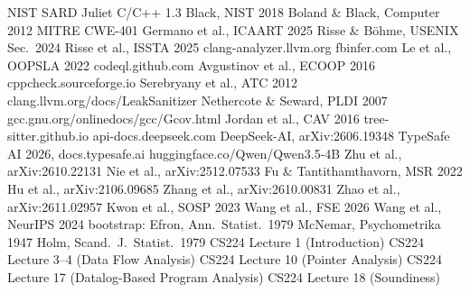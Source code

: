 \newcommand{\bib}[1]{\ifcsname bib-#1\endcsname\csname bib-#1\endcsname\else\textbf{??#1}\fi}
\newcommand{\defbib}[2]{\expandafter\def\csname bib-#1\endcsname{#2}}
\defbib{sardjuliet13}{NIST SARD Juliet C/C++ 1.3}
\defbib{black2018juliet13}{Black, NIST 2018}
\defbib{boland2012juliet}{Boland \& Black, Computer 2012}
\defbib{mitrecwe401}{MITRE CWE-401}
\defbib{germano2025biased}{Germano et al., ICAART 2025}
\defbib{risse2024limits}{Risse \& B\"ohme, USENIX Sec.\ 2024}
\defbib{risse2025topscore}{Risse et al., ISSTA 2025}
\defbib{clangsa}{clang-analyzer.llvm.org}
\defbib{inferpulse}{fbinfer.com}
\defbib{le2022pulse}{Le et al., OOPSLA 2022}
\defbib{codeqldocs}{codeql.github.com}
\defbib{avgustinov2016ql}{Avgustinov et al., ECOOP 2016}
\defbib{cppcheck}{cppcheck.sourceforge.io}
\defbib{serebryany2012asan}{Serebryany et al., ATC 2012}
\defbib{lsan}{clang.llvm.org/docs/LeakSanitizer}
\defbib{nethercote2007valgrind}{Nethercote \& Seward, PLDI 2007}
\defbib{url-gcov}{gcc.gnu.org/onlinedocs/gcc/Gcov.html}
\defbib{jordan2016souffle}{Jordan et al., CAV 2016}
\defbib{url-treesitter}{tree-sitter.github.io}
\defbib{deepseekdocs}{api-docs.deepseek.com}
\defbib{deepseek2026v4}{DeepSeek-AI, arXiv:2606.19348}
\defbib{typesafe2026jev}{TypeSafe AI 2026, docs.typesafe.ai}
\defbib{qwen35card}{huggingface.co/Qwen/Qwen3.5-4B}
\defbib{zhu2026interndecision}{Zhu et al., arXiv:2610.22131}
\defbib{nie2025vulnllmr}{Nie et al., arXiv:2512.07533}
\defbib{fu2022linevul}{Fu \& Tantithamthavorn, MSR 2022}
\defbib{hu2022lora}{Hu et al., arXiv:2106.09685}
\defbib{zhang2026anyjev}{Zhang et al., arXiv:2610.00831}
\defbib{zhao2026cyberjev}{Zhao et al., arXiv:2611.02957}
\defbib{kwon2023vllm}{Kwon et al., SOSP 2023}
\defbib{wang2026nesa}{Wang et al., FSE 2026}
\defbib{wang2024llmdfa}{Wang et al., NeurIPS 2024}
\defbib{efron1979}{bootstrap: Efron, Ann.\ Statist.\ 1979}
\defbib{mcnemar1947}{McNemar, Psychometrika 1947}
\defbib{holm1979}{Holm, Scand.\ J.\ Statist.\ 1979}
\defbib{cs224-l1}{CS224 Lecture 1 (Introduction)}
\defbib{cs224-l3}{CS224 Lecture 3--4 (Data Flow Analysis)}
\defbib{cs224-l10}{CS224 Lecture 10 (Pointer Analysis)}
\defbib{cs224-l17}{CS224 Lecture 17 (Datalog-Based Program Analysis)}
\defbib{cs224-l18}{CS224 Lecture 18 (Soundiness)}

